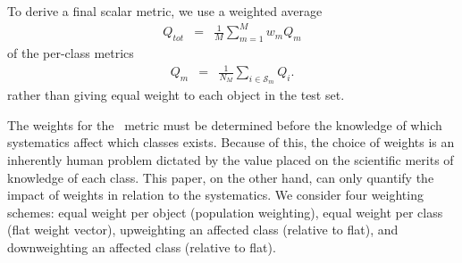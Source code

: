 To derive a final scalar metric, we use a weighted average
\begin{eqnarray}
Q_{tot} &=& \frac{1}{M}\sum_{m=1}^{M}w_{m}Q_{m}
\end{eqnarray}
of the per-class metrics
\begin{eqnarray}
Q_{m} &=& \frac{1}{N_{M}}\sum_{i\in\mathcal{S}_{m}}Q_{i}.
\end{eqnarray}
rather than giving equal weight to each object in the test set.

The weights for the \plasticc\ metric must be determined before the knowledge of which systematics affect which classes exists.
Because of this, the choice of weights is an inherently human problem dictated by the value placed on the scientific merits of knowledge of each class.
This paper, on the other hand, can only quantify the impact of weights in relation to the systematics.
We consider four weighting schemes: equal weight per object (population weighting), equal weight per class (flat weight vector), upweighting an affected class (relative to flat), and downweighting an affected class (relative to flat).

%
